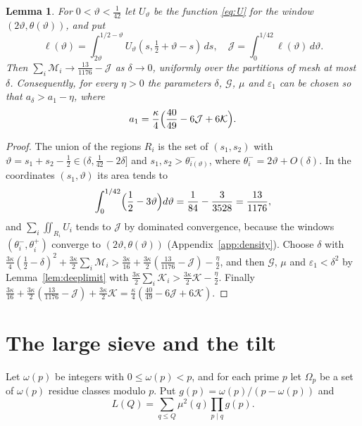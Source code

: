 \documentclass[aps,prd,twocolumn,superscriptaddress,nofootinbib,longbibliography,floatfix,showkeys,nobalancelastpage,amsmath,amssymb,10pt]{revtex4-2}
\theoremstyle{plain}
\newtheorem{lemma}[theorem]{Lemma}
\theoremstyle{definition}
\theoremstyle{plain}
\newcommand{\eps}{\varepsilon}
\newcommand{\Jc}{\mathcal{J}}
\newcommand{\Mc}{\mathcal{M}}
\begin{document}
\begin{lemma}\label{lem:limit}
For $0<\vartheta<\frac1{42}$ let $U_\vartheta$ be the function \eqref{eq:U} for the window $(2\vartheta,\theta(\vartheta))$, and put
\begin{equation}\label{eq:J}
\ell(\vartheta)=\int_{2\vartheta}^{1/2-\vartheta}U_\vartheta(s,\tfrac12+\vartheta-s)\,ds,\quad\Jc=\int_0^{1/42}\ell(\vartheta)\,d\vartheta.
\end{equation}
Then $\sum_i\Mc_i\to\frac{13}{1176}-\Jc$ as $\delta\to0$, uniformly over the partitions of mesh at most $\delta$. Consequently, for every $\eta>0$ the parameters $\delta$, $\mathcal G$, $\mu$ and $\eps_1$ can be chosen so that $a_\delta>a_1-\eta$, where
\[
a_1=\frac\kappa4\Bigl(\frac{40}{49}-6\Jc+6\mathcal K\Bigr).
\]
\end{lemma}

\begin{proof}
The union of the regions $R_i$ is the set of $(s_1,s_2)$ with $\vartheta=s_1+s_2-\frac12\in(\delta,\frac1{42}-2\delta]$ and $s_1,s_2>\theta_{i(\vartheta)}^-$, where $\theta^-_i=2\vartheta+O(\delta)$. In the coordinates $(s_1,\vartheta)$ its area tends to
\[
\int_0^{1/42}\Bigl(\frac12-3\vartheta\Bigr)d\vartheta=\frac1{84}-\frac3{3528}=\frac{13}{1176},
\]
and $\sum_i\iint_{R_i}U_i$ tends to $\Jc$ by dominated convergence, because the windows $(\theta_i^-,\theta_i^+)$ converge to $(2\vartheta,\theta(\vartheta))$ (Appendix~\ref{app:density}). Choose $\delta$ with $\frac{3\kappa}4(\frac12-\delta)^2+\frac{3\kappa}2\sum_i\Mc_i>\frac{3\kappa}{16}+\frac{3\kappa}2(\frac{13}{1176}-\Jc)-\frac\eta2$, and then $\mathcal G$, $\mu$ and $\eps_1<\delta^2$ by Lemma~\ref{lem:deeplimit} with $\frac{3\kappa}2\sum_i\mathcal K_i>\frac{3\kappa}2\mathcal K-\frac\eta2$. Finally $\frac{3\kappa}{16}+\frac{3\kappa}2(\frac{13}{1176}-\Jc)+\frac{3\kappa}2\mathcal K=\frac\kappa4(\frac{40}{49}-6\Jc+6\mathcal K)$.
\end{proof}

\section{The large sieve and the tilt}\label{sec:sieve}

Let $\omega(p)$ be integers with $0\le\omega(p)<p$, and for each prime $p$ let $\Omega_p$ be a set of $\omega(p)$ residue classes modulo $p$. Put $g(p)=\omega(p)/(p-\omega(p))$ and
\begin{equation}\label{eq:L}
L(Q)=\sum_{q\le Q}\mu^2(q)\prod_{p\mid q}g(p).
\end{equation}
\end{document}
